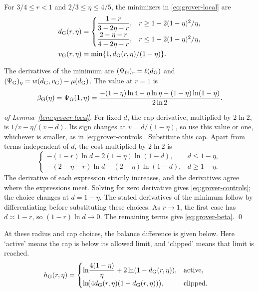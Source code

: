 \documentclass[runningheads,envcountsame,envcountsect,orivec]{llncs}
\begin{document}
\begin{lemma}
\label{lem:grover-local}
For $3/4\le r<1$ and $2/3\le\eta\le4/5$, the minimizers
in \eqref{eq:grover-local} are
\begin{align}
 d_{\rm G}(r,\eta)
  &=\begin{cases}
   \dfrac{1-r}{3-2\eta-r},
      &r\ge1-2(1-\eta)^2/\eta,\\[2mm]
   \dfrac{2-\eta-r}{4-2\eta-r},
      &r\le1-2(1-\eta)^2/\eta,
  \end{cases}\nonumber\\
 v_{\rm G}(r,\eta)
  &=\min\{1,d_{\rm G}(r,\eta)/(1-\eta)\}.
 \label{eq:grover-controls}
\end{align}

The derivatives of the minimum are
$(\Psi_{\rm G})_r=\ell(d_{\rm G})$ and
$(\Psi_{\rm G})_\eta=w(d_{\rm G},v_{\rm G})-\mu(d_{\rm G})$.
The value at $r=1$ is
\begin{align}
 \beta_{\rm G}(\eta)=\Psi_{\rm G}(1,\eta)
  =\frac{-(1-\eta)\ln4-\eta\ln\eta
               -(1-\eta)\ln(1-\eta)}{2\ln2}.
 \label{eq:grover-beta}
\end{align}
\end{lemma}

\begin{proof}[of Lemma~\ref{lem:grover-local}]
For fixed $d$, the cap derivative, multiplied by $2\ln2$,
is $1/v-\eta/(v-d)$. Its sign changes at $v=d/(1-\eta)$,
so use this value or one, whichever is smaller, as in
\eqref{eq:grover-controls}.
Substitute this cap. Apart from terms independent
of $d$, the cost multiplied by $2\ln2$ is
\[
 \begin{cases}
  -(1-r)\ln d-2(1-\eta)\ln(1-d),&d\le1-\eta,\\
  -(2-\eta-r)\ln d-(2-\eta)\ln(1-d),&d\ge1-\eta.
 \end{cases}
\]
The derivative of each expression strictly increases, and the
derivatives agree where the expressions meet. Solving for zero
derivative gives \eqref{eq:grover-controls}; the choice changes
at $d=1-\eta$. The stated derivatives of the minimum follow by
differentiating before substituting these choices.
As $r\to1$, the first case has $d\asymp1-r$,
so $(1-r)\ln d\to0$. The remaining terms give
\eqref{eq:grover-beta}.
\qed
\end{proof}

At these radius and cap choices, the balance difference is given
below. Here `active' means the cap is below its allowed limit,
and `clipped' means that limit is reached.
\begin{align}
 h_{\rm G}(r,\eta)
 &=\begin{cases}
 \ln\!\dfrac{4(1-\eta)}{\eta}+2\ln(1-d_{\rm G}(r,\eta)),
       &\text{active},\\[1mm]
 \ln\!\bigl(4d_{\rm G}(r,\eta)(1-d_{\rm G}(r,\eta))\bigr),
       &\text{clipped}.
 \end{cases}
 \label{eq:grover-residual}
\end{align}
\end{document}
